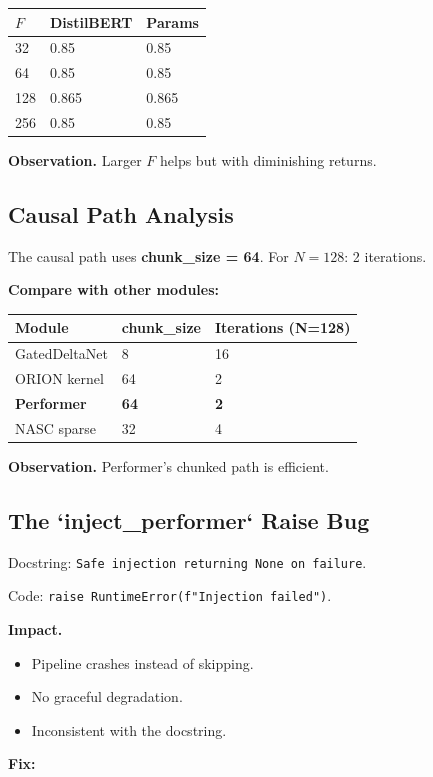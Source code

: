 \begin{table}[H]
\centering
\small
\begin{tabular}{lll}
\toprule
\textbf{$F$} & \textbf{DistilBERT} & \textbf{Params} \\
\midrule
32 & 0.85 & 0.85 \\
64 & 0.85 & 0.85 \\
128 & 0.865 & 0.865 \\
256 & 0.85 & 0.85 \\
\bottomrule
\end{tabular}
\end{table}

\textbf{Observation.} Larger $F$ helps but with diminishing returns.

\subsection{Causal Path Analysis}

The causal path uses \textbf{chunk\_size = 64}. For $N = 128$: 2 iterations.

\textbf{Compare with other modules:}

\begin{table}[H]
\centering
\small
\begin{tabular}{lll}
\toprule
\textbf{Module} & \textbf{chunk\_size} & \textbf{Iterations (N=128)} \\
\midrule
GatedDeltaNet & 8 & 16 \\
ORION kernel & 64 & 2 \\
\textbf{Performer} & \textbf{64} & \textbf{2} \\
NASC sparse & 32 & 4 \\
\bottomrule
\end{tabular}
\end{table}

\textbf{Observation.} Performer's chunked path is efficient.

\subsection{The `inject\_performer` Raise Bug}

Docstring: \texttt{Safe injection returning None on failure}.

Code: \texttt{raise RuntimeError(f"Injection failed")}.

\textbf{Impact.}

\begin{itemize}
\item Pipeline crashes instead of skipping.
\item No graceful degradation.
\item Inconsistent with the docstring.

\end{itemize}
\textbf{Fix:}

